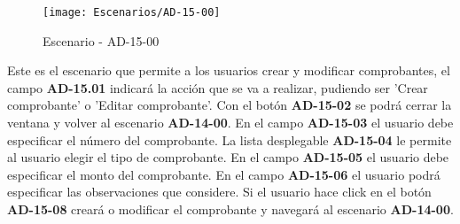 \begin{figure}[H]
\centering
\texttt{[image: Escenarios/AD-15-00]}
\caption{Escenario - AD-15-00}
\label{fig:AD-15-00}
\end{figure}
Este es el escenario que permite a los usuarios crear y modificar comprobantes, el campo \textbf{AD-15.01} indicará la acción que se va a realizar, pudiendo ser 'Crear comprobante' o 'Editar comprobante'. Con el botón \textbf{AD-15-02} se podrá cerrar la ventana y volver al escenario \textbf{AD-14-00}.
En el campo \textbf{AD-15-03} el usuario debe especificar el número del comprobante. La lista desplegable \textbf{AD-15-04} le permite al usuario elegir el tipo de comprobante. En el campo \textbf{AD-15-05} el usuario debe especificar el monto del comprobante. En el campo \textbf{AD-15-06} el usuario podrá especificar las observaciones que considere. Si el usuario hace click en el botón \textbf{AD-15-08} creará o modificar el comprobante y navegará al escenario \textbf{AD-14-00}.
\clearpage
